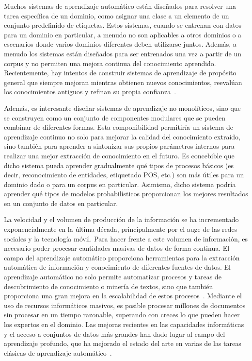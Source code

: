Muchos sistemas de aprendizaje automático están diseñados para resolver una tarea específica de un dominio, como asignar una clase a un elemento de un conjunto predefinido de etiquetas.
Estos sistemas, cuando se entrenan con datos para un dominio en particular, a menudo no son aplicables a otros dominios o a escenarios donde varios dominios diferentes deben utilizarse juntos.
Además, a menudo los sistemas están diseñados para ser entrenados una vez a partir de un corpus y no permiten una mejora continua del conocimiento aprendido.
Recientemente, hay intentos de construir sistemas de aprendizaje de propósito general que siempre mejoran mientras obtienen nuevos conocimientos, reevalúan los conocimientos antiguos y refinan su propia confianza~\cite{mitchell2015never}.

Además, es interesante diseñar sistemas de aprendizaje no monolíticos, sino que se construyen como un conjunto de componentes modulares que se pueden combinar de diferentes formas.
Esta componibilidad permitiría un sistema de aprendizaje continuo no solo para mejorar la calidad del conocimiento extraído, sino también para aprender a sintonizar sus propios parámetros internos para realizar una mejor extracción de conocimiento en el futuro.
Es concebible que dicho sistema pueda aprender gradualmente qué tipos de procesos básicos (es decir, reconocimiento de entidades, etiquetado POS, etc.) son más útiles para un dominio dado o para un corpus en particular.
Asimismo, dicho sistema podría aprender qué tipos de modelos probabilísticos proporcionan los mejores resultados en un conjunto de datos en particular.

La velocidad y el volumen de producción de la información se ha incrementado exponencialmente en la última década, principalmente por el auge de las redes sociales y la tecnología móvil.
Para hacer frente a este volumen de información, es necesario poder procesar cantidades masivas de datos de forma continua.
El campo del aprendizaje automático proporciona herramientas para la extracción automática de información y conocimiento de diferentes fuentes de datos.
El aprendizaje automático no solo permite automatizar procesos y tareas de descubrimiento de conocimiento o minería de textos, sino que también proporciona una gran mejora en la escalabilidad de estos procesos~\cite{wu2014data}.
Mediante el uso de recursos informáticos masivos, es posible procesar millones de documentos sin procesar en un tiempo razonable, superando con creces lo que pueden hacer los expertos en el dominio.
Las mejoras recientes en las capacidades informáticas y el acceso a conjuntos de datos más grandes han dado lugar al campo del aprendizaje profundo, que ha mejorado el estado del arte en varias de las tareas clásicas de aprendizaje automático~\cite{lecun2015deep}.


